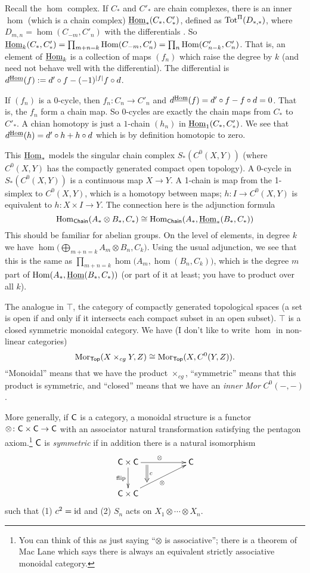 
Recall the $\hom$ complex. If $C_*$ and $C'_*$ are chain complexes, there is an inner $\hom$ (which is a chain complex) $\operatorname{\underline{Hom}}_*(C_*,C'_*)$, defined as $\operatorname{Tot}^\Pi(D_{*,*})$, where $D_{m,n}=\hom(C_{-m},C'_n)$ with the differentials . So $\operatorname{\underline{Hom}}_k(C_*,C'_*)=\prod_{m+n=k} \operatorname{Hom}(C_{-m},C'_n) = \prod_n \operatorname{Hom}(C'_{n-k},C'_n)$. That is, an element of $\operatorname{\underline{Hom}}_k$ is a collection of maps $(f_n)$ which raise the degree by $k$ (and need not behave well with the differential). The differential is $d^{\operatorname{\underline{Hom}}}(f):= d'\circ f - (-1)^{|f|}f\circ d$.

If $(f_n)$ is a $0$-cycle, then $f_n\colon C_n\to C'_n$ and $d^{\operatorname{\underline{Hom}}}(f) = d'\circ f -f\circ d=0$. That is, the $f_n$ form a chain map. So $0$-cycles are exactly the chain maps from $C_*$ to $C'_*$. A chian homotopy is just a $1$-chain $(h_n)$ in $\operatorname{\underline{Hom}}_1(C_*,C'_*)$. We see that $d^{\operatorname{\underline{Hom}}}(h) = d'\circ h + h\circ d$ which is by definition homotopic to zero.

This $\operatorname{\underline{Hom}}_*$ models the singular chain complex $S_*(C^0(X,Y))$ (where $C^0(X,Y)$ has the compactly generated compact open topology). A 0-cycle in $S_*(C^0(X,Y))$ is a continuous map $X\to Y$. A 1-chain is map from the 1-simplex to $C^0(X,Y)$, which is a homotopy between maps; $h\colon I\to C^0(X,Y)$ is equivalent to $h\colon X\times I\to Y$. The connection here is the adjunction formula
\[
 \operatorname{Hom}_{\text{\sf Chain}} (A_*\otimes B_*,C_*)\cong \operatorname{Hom}_{\text{\sf Chain}}(A_*,\operatorname{\underline{Hom}}_*(B_*,C_*))
\]
This should be familiar for abelian groups. On the level of elements, in degree $k$ we have $\hom\bigl(\bigoplus_{m+n=k} A_m\otimes B_n, C_k\bigr)$. Using the usual adjunction, we see that this is the same as $\prod_{m+n=k} \hom\bigl( A_m, \hom(B_n,C_k) \bigr)$, which is the degree $m$ part of $\operatorname{Hom}(A_*,\operatorname{\underline{Hom}}(B_*,C_*))$ (or part of it at least; you have to product over all $k$). 

The analogue in $\top$, the category of compactly generated topological spaces (a set is open if and only if it intersects each compact subset in an open subset). $\top$ is a closed symmetric monoidal category. We have (I don't like to write $\hom$ in non-linear categories) 
\[
 \operatorname{Mor}_{\text{\sf Top}}(X\times_{cg} Y,Z)\cong \operatorname{Mor}_{\text{\sf Top}}(X,C^0(Y,Z)).
\]
``Monoidal'' means that we have the product $\times_{cg}$, ``symmetric'' means that this product is symmetric, and ``closed'' means that we have an \emph{inner Mor} $C^0(-,-)$.

More generally, if $\text{\sf C}$ is a category, a monoidal structure is a functor $\otimes \colon \text{\sf C}\times \text{\sf C}\to \text{\sf C}$ with an associator natural transformation satisfying the pentagon axiom.\footnote{You can think of this as just saying ``$\otimes$ is associative''; there is a theorem of Mac Lane which says there is always an equivalent strictly associative monoidal category.} $\text{\sf C}$ is \emph{symmetric} if in addition there is a natural isomorphism
\[\xymatrix{
 \C \times \C \ar[rr]^\otimes_(.3){}="a" \ar[d]_{\text{flip}} & & \C\\
 \C\times \C \ar[urr]^(.3){}="b"_\otimes
 \ar@{=>}^c "a";"b"
}\]
such that (1) $c^2=\operatorname{id}$ and (2) $S_n$ acts on $X_1\otimes\cdots\otimes X_n$.

